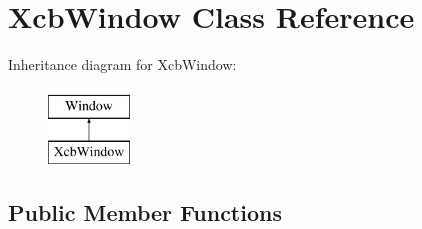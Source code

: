 \hypertarget{classXcbWindow}{}\section{Xcb\+Window Class Reference}
\label{classXcbWindow}
Inheritance diagram for Xcb\+Window\+:\begin{figure}[H]
\begin{center}
\leavevmode
\includegraphics[height=2.000000cm]{classXcbWindow}
\end{center}
\end{figure}
\subsection*{Public Member Functions}

